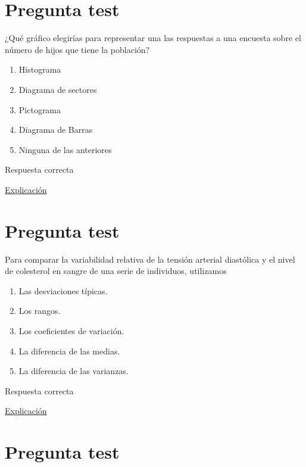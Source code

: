 \documentclass[
]{book}
\providecommand{\tightlist}{%
  \setlength{\itemsep}{0pt}\setlength{\parskip}{0pt}}
\begin{document}
\hypertarget{pregunta-test-61}{%
\section{Pregunta test}\label{pregunta-test-61}}

¿Qué gráfico elegirías para representar una las respuestas a una encuesta sobre el número de hijos que tiene la población?

\begin{enumerate}
\def\labelenumi{\alph{enumi})}
\tightlist
\item
  Histograma
\item
  Diagrama de sectores
\item
  Pictograma
\item
  Diagrama de Barras
\item
  Ninguna de las anteriores
\end{enumerate}

Respuesta correcta

\href{https://1fjmanzano.github.io/bioestadistica/diagramas-de-barras-y-sectores.html}{Explicación}

\hypertarget{pregunta-test-62}{%
\section{Pregunta test}\label{pregunta-test-62}}

Para comparar la variabilidad relativa de la tensión arterial diastólica y el nivel de colesterol en sangre de una serie de individuos, utilizamos

\begin{enumerate}
\def\labelenumi{\alph{enumi})}
\tightlist
\item
  Las desviaciones típicas.
\item
  Los rangos.
\item
  Los coeficientes de variación.
\item
  La diferencia de las medias.
\item
  La diferencia de las varianzas.
\end{enumerate}

Respuesta correcta

\href{https://1fjmanzano.github.io/bioestadistica/medidas-de-posicio\%CC\%81n-dispersio\%CC\%81n-y-forma.html}{Explicación}

\hypertarget{pregunta-test-63}{%
\section{Pregunta test}\label{pregunta-test-63}}
\end{document}
